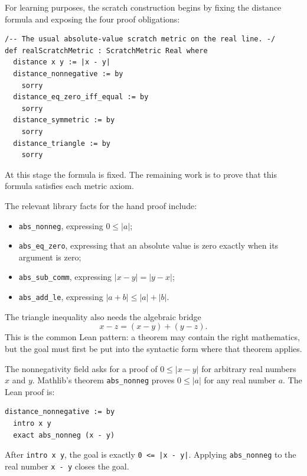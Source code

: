 \begin{example*}
For learning purposes, the scratch construction begins by fixing the distance
formula and exposing the four proof obligations:
\begin{verbatim}
/-- The usual absolute-value scratch metric on the real line. -/
def realScratchMetric : ScratchMetric Real where
  distance x y := |x - y|
  distance_nonnegative := by
    sorry
  distance_eq_zero_iff_equal := by
    sorry
  distance_symmetric := by
    sorry
  distance_triangle := by
    sorry
\end{verbatim}
At this stage the formula is fixed. The remaining work is to prove that this
formula satisfies each metric axiom.
\end{example*}

\begin{remark*}
The relevant library facts for the hand proof include:
\begin{itemize}
  \item \texttt{abs\_nonneg}, expressing $0\le |a|$;
  \item \texttt{abs\_eq\_zero}, expressing that an absolute value is zero
        exactly when its argument is zero;
  \item \texttt{abs\_sub\_comm}, expressing $|x-y|=|y-x|$;
  \item \texttt{abs\_add\_le}, expressing $|a+b|\le |a|+|b|$.
\end{itemize}
The triangle inequality also needs the algebraic bridge
\[
  x-z=(x-y)+(y-z).
\]
This is the common Lean pattern: a theorem may contain the right mathematics,
but the goal must first be put into the syntactic form where that theorem
applies.
\end{remark*}

\begin{example*}[Nonnegativity]
The nonnegativity field asks for a proof of \(0\le |x-y|\) for arbitrary real
numbers \(x\) and \(y\). Mathlib's theorem \texttt{abs\_nonneg} proves
\(0\le |a|\) for any real number \(a\). The Lean proof is:
\begin{verbatim}
distance_nonnegative := by
  intro x y
  exact abs_nonneg (x - y)
\end{verbatim}
After \texttt{intro x y}, the goal is exactly
\texttt{0 <= |x - y|}. Applying \texttt{abs\_nonneg} to the real number
\texttt{x - y} closes the goal.
\end{example*}

